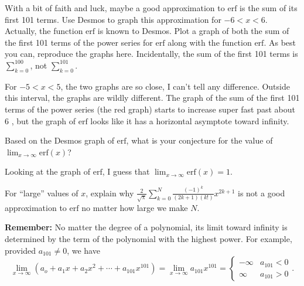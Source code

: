 \documentclass[12pt,fleqn]{exam}
\newcommand{\erf}{\mathrm{erf}}
\begin{document}
\begin{questions}
\newpage

\question [1]  With a bit of faith and luck, maybe a good approximation to $\erf$ is the sum of its first 101 terms.
Use Desmos to graph this approximation for $-6 < x < 6$.   Actually, the function $\erf$ is known to Desmos. Plot
a graph of both the sum of the first 101 terms of the power series for $\erf$ along with the function $\erf$.
As best you can, reproduce the graphs here.  Incidentally, the sum of the first 101 terms is $\displaystyle \sum_{k=0}^{100}$,
not $\displaystyle \sum_{k=0}^{101}$.


\begin{solution}[1.5in]
For $-5 < x < 5$, the two graphs are so close, I can't tell any difference. Outside this interval, the graphs are wildly different.
The graph of the sum of the first 101 terms of the power series (the red graph) starts to increase super fast past about 6
, but the graph of $\erf$ looks like it has a horizontal asymptote toward infinity.


\end{solution}


\question [1] Based on the Desmos graph of $\erf$, what is your conjecture for the value of $\displaystyle \lim_{x \to \infty} \erf(x)$? 


\begin{solution}%
Looking at the graph of $\erf$, I guess that $\displaystyle \lim_{x \to \infty} \erf(x) = 1$.

\end{solution}

\newpage

\question [1]   For ``large'' values of $x$, explain why 
$\frac{2}{\sqrt{\uppi}}  \sum_{k=0}^{N} \frac{(-1)^k}{ (2 k + 1) (k !)}   x^{2 k +1}$ is not a good approximation to $\erf$
no matter how large we make $N$.  

\textbf{Remember:} No matter the degree of a polynomial, its limit toward infinity is determined 
by the term of the polynomial with the highest power.  For example, provided $a_{101} \neq 0$, we have 
\begin{equation*}
  \lim_{x \to \infty}  \left( a_o + a_1 x + a_2 x^2 + \cdots + a_{101} x^{101} \right)  =  
  \lim_{x \to \infty} a_{101} x^{101}  = \begin{cases}  -\infty & a_{101} < 0 \\ \infty & a_{101} > 0 \end{cases}.
\end{equation*}


\end{questions}
\end{document}
